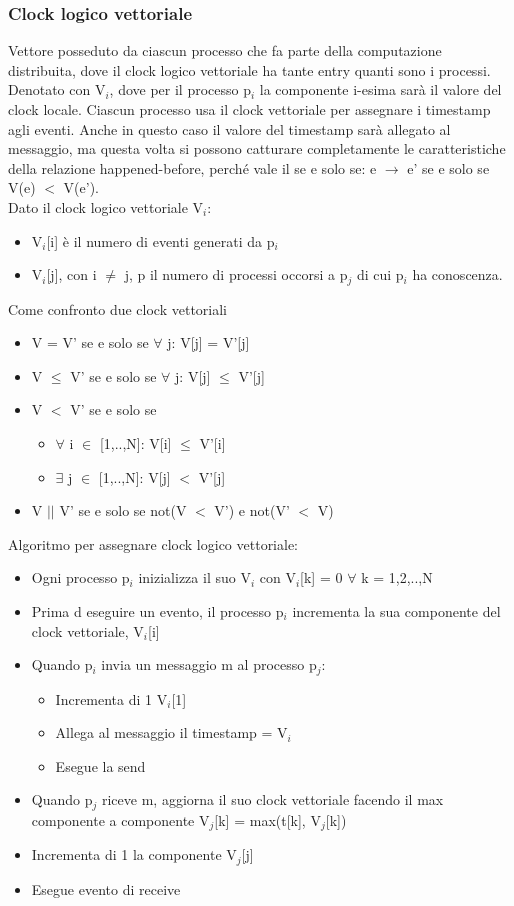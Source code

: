 \documentclass[16px]{article}
\begin{document}
\subsubsection{Clock logico vettoriale}
Vettore posseduto da ciascun processo che fa parte della computazione distribuita, dove il clock logico vettoriale ha tante entry quanti sono i processi. Denotato con V$_i$, dove per il processo p$_i$ la componente i-esima sarà il valore del clock locale. Ciascun processo usa il clock vettoriale per assegnare i timestamp agli eventi. Anche in questo caso il valore del timestamp sarà allegato al messaggio, ma questa volta si possono catturare completamente le caratteristiche della relazione happened-before, perché vale il se e solo se: e $\rightarrow$ e' se e solo se V(e) $<$ V(e').\\ Dato il clock logico vettoriale V$_i$:
\begin{itemize}
\item V$_i$[i] è il numero di eventi generati da p$_i$
\item V$_i$[j], con i $\neq$ j, p il numero di processi occorsi a p$_j$ di cui p$_i$ ha conoscenza.
\end{itemize}
Come confronto due clock vettoriali
\begin{itemize}
\item V = V' se e solo se $\forall$ j: V[j] = V'[j]
\item V $\leq$ V' se e solo se $\forall$ j: V[j] $\leq$ V'[j]
\item V $<$ V' se e solo se
\begin{itemize}
\item $\forall$ i $\in$ [1,..,N]: V[i] $\leq$ V'[i]
\item $\exists$ j $\in$ [1,..,N]: V[j] $<$ V'[j]
\end{itemize}
\item V $||$ V' se e solo se not(V $<$ V') e not(V' $<$ V) 
\end{itemize}
Algoritmo per assegnare clock logico vettoriale:
\begin{itemize}
\item Ogni processo p$_i$ inizializza il suo  V$_i$ con  V$_i$[k] = 0 $\forall$ k = 1,2,..,N
\item Prima d eseguire un evento, il processo  p$_i$ incrementa la sua componente del clock vettoriale,  V$_i$[i]
\item Quando  p$_i$ invia un messaggio m al processo  p$_j$:
\begin{itemize}
\item Incrementa di 1 V$_i$[1]
\item Allega al messaggio il timestamp =  V$_i$
\item Esegue la send
\end{itemize}
\item Quando  p$_j$ riceve m, aggiorna il suo clock vettoriale  facendo il max componente a componente  V$_j$[k] = max(t[k],  V$_j$[k])
\item Incrementa di 1 la componente  V$_j$[j]
\item Esegue evento di receive
\end{itemize}
\end{document}
